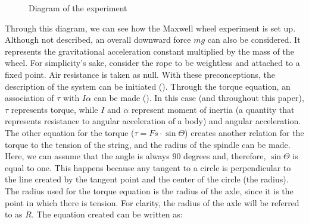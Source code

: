 \documentclass{article}
\begin{document}
\begin{figure}[H]
\caption{Diagram of the experiment} 
\label{fig: Diagram of the experiment}
\end{figure}

Through this diagram, we can see how the Maxwell wheel experiment is set up. Although not described, an overall downward force $mg$ can also be considered. It represents the gravitational acceleration constant multiplied by the mass of the wheel. For simplicity's sake, consider the rope to be weightless and attached to a fixed point. Air resistance is taken as null. With these preconceptions, the description of the system can be initiated (\cite{irodovsolutionsmechanics}). Through the torque equation, an association of $\tau$ with $I\alpha$ can be made (\cite{momentofinertia}). In this case (and throughout this paper), $\tau$ represents torque, while $I$ and $\alpha$ represent moment of inertia (a quantity that represents resistance to angular acceleration of a body) and angular acceleration. The other equation for the torque ($\tau=Fs\cdot\sin{\Theta}$) creates another relation for the torque to the tension of the string, and the radius of the spindle can be made. Here, we can assume that the angle is always 90 degrees and, therefore, $\sin{\Theta}$ is equal to one. This happens because any tangent to a circle is perpendicular to the line created by the tangent point and the center of the circle (the radius). The radius used for the torque equation is the radius of the axle, since it is the point in which there is tension. For clarity, the radius of the axle will be referred to as $R$. The equation created can be written as:
\end{document}
